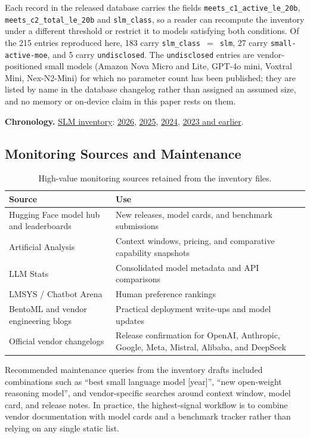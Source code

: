 Each record in the released database carries the fields \texttt{meets\_c1\_active\_le\_20b}, \texttt{meets\_c2\_total\_le\_20b} and \texttt{slm\_class}, so a reader can recompute the inventory under a different threshold or restrict it to models satisfying both conditions. Of the 215 entries reproduced here, 183 carry \texttt{slm\_class}~$=$~\texttt{slm}, 27 carry \texttt{small-active-moe}, and 5 carry \texttt{undisclosed}. The \texttt{undisclosed} entries are vendor-positioned small models (Amazon Nova Micro and Lite, GPT-4o mini, Voxtral Mini, Nex-N2-Mini) for which no parameter count has been published; they are listed by name in the database changelog rather than assigned an assumed size, and no memory or on-device claim in this paper rests on them.

{\footnotesize\noindent\textbf{Chronology.} \hyperref[tab:model_inventory_slm_by_year]{SLM inventory}: \hyperlink{model-year-slm-2026}{2026}, \hyperlink{model-year-slm-2025}{2025}, \hyperlink{model-year-slm-2024}{2024}, \hyperlink{model-year-slm-2023-and-earlier}{2023 and earlier}.\par}


\subsection{Monitoring Sources and Maintenance}
\label{subsec:ecosystem_monitoring}
\begin{table}[ht]
\centering
\caption{High-value monitoring sources retained from the inventory files.}
\label{tab:ecosystem_sources}
\footnotesize
\begin{tabularx}{\textwidth}{L{4cm}X}
\toprule
\textbf{Source} & \textbf{Use} \\
\midrule
Hugging Face model hub and leaderboards & New releases, model cards, and benchmark submissions \\
Artificial Analysis & Context windows, pricing, and comparative capability snapshots \\
LLM Stats & Consolidated model metadata and API comparisons \\
LMSYS / Chatbot Arena & Human preference rankings \\
BentoML and vendor engineering blogs & Practical deployment write-ups and model updates \\
Official vendor changelogs & Release confirmation for OpenAI, Anthropic, Google, Meta, Mistral, Alibaba, and DeepSeek \\
\bottomrule
\end{tabularx}
\end{table}

Recommended maintenance queries from the inventory drafts included combinations such as ``best small language model [year]'', ``new open-weight reasoning model'', and vendor-specific searches around context window, model card, and release notes. In practice, the highest-signal workflow is to combine vendor documentation with model cards and a benchmark tracker rather than relying on any single static list.
